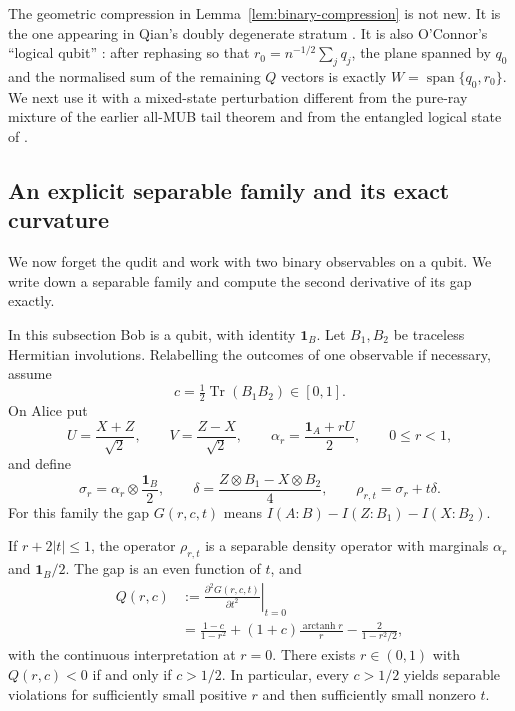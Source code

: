 The geometric compression in Lemma~\ref{lem:binary-compression} is
not new.  It is the one appearing in Qian's doubly degenerate stratum
\cite[Proposition~6.9]{qian}.  It is also O'Connor's ``logical qubit''
\cite{oconnor}: after rephasing so that $r_0=n^{-1/2}\sum_jq_j$, the
plane spanned by $q_0$ and the normalised sum of the remaining $Q$
vectors is exactly $W=\operatorname{span}\{q_0,r_0\}$.  We next use it
with a mixed-state perturbation different from the pure-ray mixture of
the earlier all-MUB tail theorem \cite[Theorem~4.1]{qian} and from the
entangled logical state of \cite{oconnor}.

\subsection{An explicit separable family and its exact curvature}
\label{sec:curvature}

We now forget the qudit and work with two binary observables on a qubit.
We write down a separable family and compute the second derivative of
its gap exactly.

In this subsection Bob is a qubit, with identity $\mathbf1_B$.  Let
$B_1,B_2$ be traceless Hermitian involutions.  Relabelling the outcomes
of one observable if necessary, assume
\begin{equation}
 c=\tfrac12\operatorname{Tr}(B_1B_2)\in[0,1].
 \label{eq:binary-overlap}
\end{equation}
On Alice put
\begin{equation}
 U=\frac{X+Z}{\sqrt2},\qquad
 V=\frac{Z-X}{\sqrt2},\qquad
 \alpha_r=\frac{\mathbf1_A+rU}{2},\qquad 0\leq r<1,
 \label{eq:alice-anchor}
\end{equation}
and define
\begin{equation}
 \sigma_r=\alpha_r\otimes\frac{\mathbf1_B}{2},\qquad
 \delta=\frac{Z\otimes B_1-X\otimes B_2}{4},\qquad
 \rho_{r,t}=\sigma_r+t\delta.
 \label{eq:separable-family}
\end{equation}
For this family the gap $G(r,c,t)$ means
$I(A:B)-I(Z:B_1)-I(X:B_2)$.

\begin{proposition}
\label{prop:curvature-family}
 If $r+2|t|\leq1$, the operator $\rho_{r,t}$ is a separable density
 operator with marginals $\alpha_r$ and $\mathbf1_B/2$.  The gap is an
 even function of $t$, and
 \begin{equation}
 \begin{split}
  Q(r,c)
  &:=\left.\frac{\partial^2G(r,c,t)}{\partial t^2}\right|_{t=0}\\
  &=\frac{1-c}{1-r^2}
    +(1+c)\frac{\operatorname{arctanh}r}{r}
    -\frac{2}{1-r^2/2},
 \end{split}
 \label{eq:curvature-formula}
 \end{equation}
 with the continuous interpretation at $r=0$.
 There exists $r\in(0,1)$ with $Q(r,c)<0$ if and only if $c>1/2$.
 In particular, every $c>1/2$ yields separable violations for
 sufficiently small positive $r$ and then sufficiently small nonzero
 $t$.
\end{proposition}

